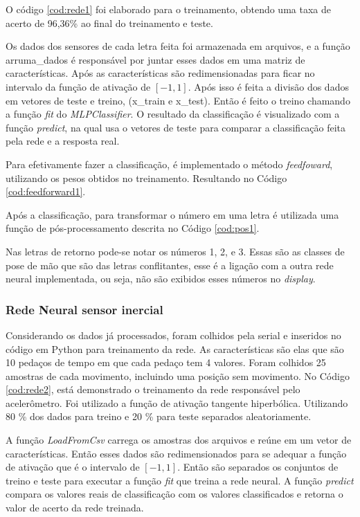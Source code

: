 O código \ref{cod:rede1} foi elaborado para o treinamento, obtendo uma taxa de acerto de 96,36\% ao final do treinamento e teste. \hspace{20pt}

Os dados dos sensores de cada letra feita foi armazenada em arquivos, e a função arruma\_dados é responsável por juntar esses dados em uma matriz de características. Após as características são redimensionadas para ficar no intervalo da função de ativação de $[-1, 1]$. Após isso é feita a divisão dos dados em vetores de teste e treino, (x\_train e x\_test). Então é feito o treino chamando a função \textit{fit} do \textit{MLPClassifier}. O resultado da classificação é visualizado com a função \textit{predict}, na qual usa o vetores de teste para comparar a classificação feita pela rede e a resposta real.

Para efetivamente fazer a classificação, é implementado o método \textit{feedfoward}, utilizando os pesos obtidos no treinamento. Resultando no Código \ref{cod:feedforward1}.

Após a classificação, para transformar o número em uma letra é utilizada uma função de pós-processamento descrita no Código \ref{cod:pos1}.

Nas letras de retorno pode-se notar os números 1, 2, e 3. Essas são as classes de pose de mão que são das letras conflitantes, esse é a ligação com a outra rede neural implementada, ou seja, não são exibidos esses números no \textit{display}.

\subsubsection{Rede Neural sensor inercial}
Considerando os dados já processados, foram colhidos pela serial e inseridos no código em Python para treinamento da rede. As características
são elas que são 10 pedaços de tempo em que cada pedaço tem 4 valores. Foram colhidos 25 amostras de cada movimento, incluindo uma posição sem movimento. No Código \ref{cod:rede2}, está demonstrado o treinamento da rede responsável pelo acelerômetro. Foi utilizado a função de ativação tangente hiperbólica. Utilizando 80 \% dos dados para treino e 20 \% para teste separados aleatoriamente.
 
 
A função \textit{LoadFromCsv} carrega os amostras dos arquivos e reúne em um vetor de características. Então esses dados são redimensionados para se adequar a função de ativação que é o intervalo de $[-1, 1]$. Então são separados os conjuntos de treino e teste para executar a função \textit{fit} que treina a rede neural. A função \textit{predict} compara os valores reais de classificação com os valores classificados e retorna o valor de acerto da rede treinada.

